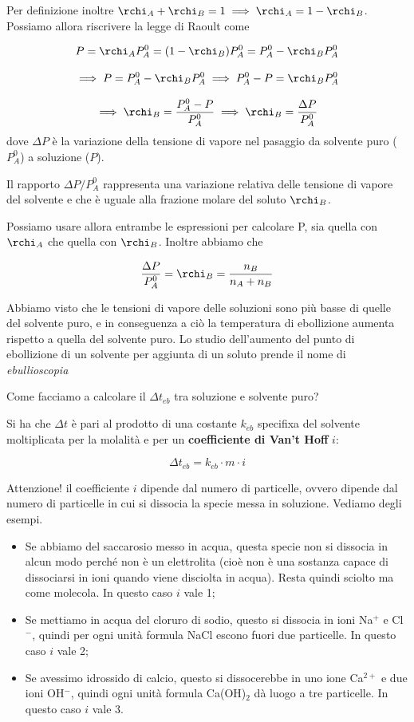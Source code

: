 Per definizione inoltre $\rchi_A + \rchi_B = 1 \implies \rchi_A = 1 - \rchi_B$. Possiamo allora riscrivere la legge di Raoult come 

$$P=\rchi_AP^0_A=(1- \rchi_B)P^0_A=P^0_A - \rchi_BP^0_A$$

$$\implies P=P^0_A - \rchi_BP^0_A \implies P^0_A - P = \rchi_BP^0_A$$

$$\implies \rchi_B=\frac{P^0_A - P}{P^0_A} \implies \rchi_B=\frac{\Delta P}{P^0_A}$$
dove $\Delta P$ è la variazione della tensione di vapore nel pasaggio da solvente puro ($P_A^0$) a soluzione ($P$).

Il rapporto $\Delta P/P_A^0$ rappresenta una variazione relativa delle tensione di vapore del solvente e che è uguale alla frazione molare del soluto $\rchi_B$.

Possiamo usare allora entrambe le espressioni per calcolare P, sia quella con $\rchi_A$ che quella con $\rchi_B$. Inoltre abbiamo che

$$\frac{\Delta P}{P_A^0}= \rchi_B = \frac{n_B}{n_A + n_B}$$

Abbiamo visto che le tensioni di vapore delle soluzioni sono più basse di quelle del solvente puro, e in conseguenza a ciò la temperatura di ebollizione aumenta rispetto a quella del solvente puro. Lo studio dell'aumento del punto di ebollizione di un solvente per aggiunta di un soluto prende il nome di \textit{ebullioscopia}

Come facciamo a calcolare il $\Delta t_{eb}$ tra soluzione e solvente puro?

Si ha che $\Delta t$ è pari al prodotto di una costante $k_{eb}$ specifixa del solvente moltiplicata per la molalità e per un \textbf{coefficiente di Van't Hoff} $i$:

$$\Delta t_{eb} = k_{eb} \cdot m \cdot i$$

Attenzione! il coefficiente $i$ dipende dal numero di particelle, ovvero dipende dal numero di particelle in cui si dissocia la specie messa in soluzione. Vediamo degli esempi.

\begin{itemize}
    \item Se abbiamo del saccarosio messo in acqua, questa specie non si dissocia in alcun modo perché non è un elettrolita (cioè non è una sostanza capace di dissociarsi in ioni quando viene disciolta in acqua). Resta quindi sciolto ma come molecola. In questo caso $i$ vale 1;
    \item Se mettiamo in acqua del cloruro di sodio, questo si dissocia in ioni Na$^+$ e Cl$^-$, quindi per ogni unità formula NaCl escono fuori due particelle. In questo caso $i$ vale 2;
    \item Se avessimo idrossido di calcio, questo si dissocerebbe in uno ione Ca$^{2+}$ e due ioni OH$^-$, quindi ogni unità formula Ca(OH)$_2$ dà luogo a tre particelle. In questo caso $i$ vale 3.
\end{itemize}

